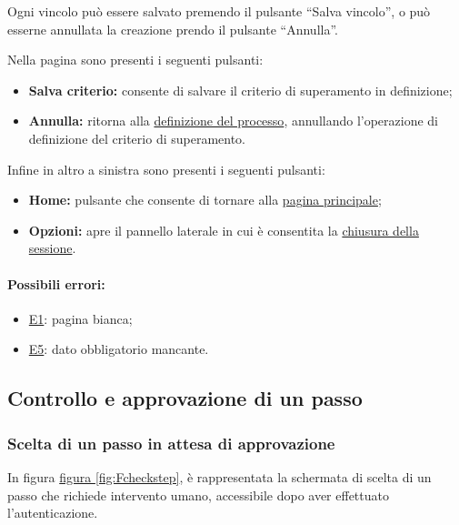 Ogni vincolo può essere salvato premendo il pulsante ``Salva vincolo'', o può esserne annullata la creazione prendo il pulsante ``Annulla''.

Nella pagina sono presenti i seguenti pulsanti:
\begin{itemize}
\item \textbf{Salva criterio:} consente di salvare il criterio di superamento in definizione;
\item \textbf{Annulla:} ritorna alla \hyperref[newprocess]{definizione del processo}, annullando l'operazione di definizione del criterio di superamento.
\end{itemize}

Infine in altro a sinistra sono presenti i seguenti pulsanti:
\begin{itemize}
\item \textbf{Home:} pulsante che consente di tornare alla \hyperref[home]{pagina principale};
\item \textbf{Opzioni:} apre il pannello laterale in cui è consentita la \hyperref[logout]{chiusura della sessione}.
\end{itemize}

\paragraph*{Possibili errori:}
\begin{itemize}
\item \hyperref[e1]{E1}: pagina bianca;
\item \hyperref[e5]{E5}: dato obbligatorio mancante.
\end{itemize}

\subsection{Controllo e approvazione di un passo}
\label{controllo}

\subsubsection{Scelta di un passo in attesa di approvazione}

In figura \hyperref[fig:Fcheckstep]{figura \ref{fig:Fcheckstep}}, è rappresentata la schermata di scelta di un passo che richiede intervento umano, accessibile dopo aver effettuato l'autenticazione.

